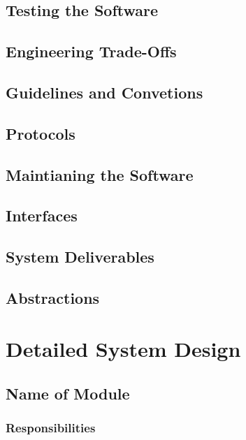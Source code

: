 \documentclass[11pt]{article}
\begin{document}
\subsection{Testing the Software}
\label{sec:testing}

\subsection{Engineering Trade-Offs}
\label{sec:tradeoffs}

\subsection{Guidelines and Convetions}
\label{sec:guidelines}

\subsection{Protocols}
\label{sec:protocols}

\subsection{Maintianing the Software}
\label{sec:maintain}

\subsection{Interfaces}
\label{sec:interfaces}

\subsection{System Deliverables}
\label{sec:deliverables}

\subsection{Abstractions}
\label{sec:abstractions}

\section{Detailed System Design}
\label{sec:detailed}

\subsection{Name of Module}
\label{sec:module}

\subsubsection{Responsibilities}
\label{sec:responsibilities}
\end{document}
